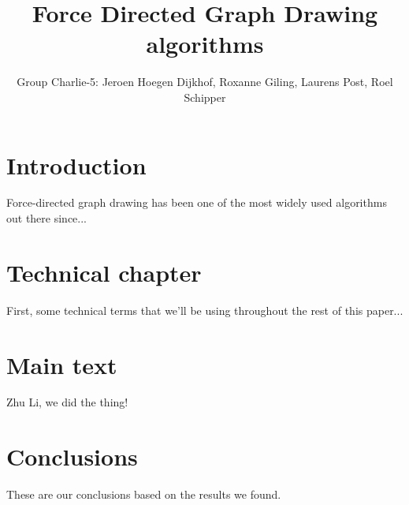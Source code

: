 \documentclass[a4paper,12pt,twoside]{article}
\begin{document}
\title{Force Directed Graph Drawing algorithms}
\author{Group Charlie-5: Jeroen Hoegen Dijkhof, Roxanne Giling, Laurens Post, Roel Schipper}
\newpage
\tableofcontents
\newpage
\section{Introduction}
Force-directed graph drawing has been one of the most widely used algorithms out there since...
\section{Technical chapter}
First, some technical terms that we'll be using throughout the rest of this paper...
\section{Main text}
Zhu Li, we did the thing!
\section{Conclusions}
These are our conclusions based on the results we found.
\begin{thebibliography}{99}
\end{thebibliography}
\end{document}
